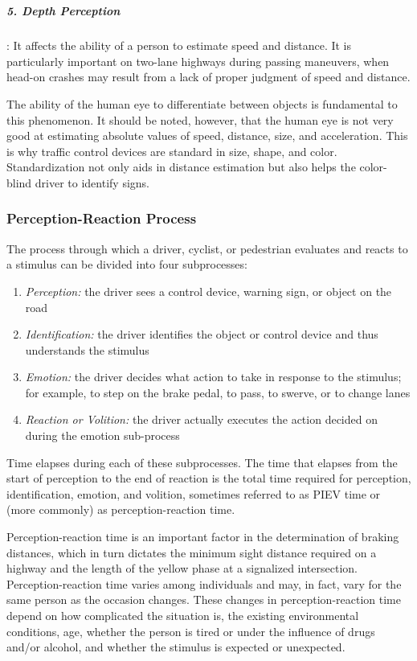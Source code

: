 \\
\subparagraph{5. Depth Perception}: It affects the ability of a person to estimate speed and distance. It is particularly important on two-lane highways during passing maneuvers, when head-on crashes may result from a lack of proper judgment of speed and distance.\par
The ability of the human eye to differentiate between objects is fundamental to this phenomenon. It should be noted, however, that the human eye is not very good at estimating absolute values of speed, distance, size, and acceleration. This is why traffic control devices are standard in size, shape, and color. Standardization not only aids in distance estimation but also helps the color-blind driver to identify signs.
\\
\subsubsection{Perception-Reaction Process}
The process through which a driver, cyclist, or pedestrian evaluates and reacts to a stimulus can be divided into four subprocesses:
\begin{enumerate}
	\item \emph{Perception:} the driver sees a control device, warning sign, or object on the road
	\item \emph{Identification:} the driver identifies the object or control device and thus understands the stimulus
	\item \emph{Emotion:} the driver decides what action to take in response to the stimulus; for example, to step on the brake pedal, to pass, to swerve, or to change lanes
	\item \emph{Reaction or Volition:} the driver actually executes the action decided on during the emotion sub-process
\end{enumerate}
\par
Time elapses during each of these subprocesses. The time that elapses from the start of perception to the end of reaction is the total time required for perception, identification, emotion, and volition, sometimes referred to as PIEV time or (more commonly) as perception-reaction time.\\
\par
Perception-reaction time is an important factor in the determination of braking distances, which in turn dictates the minimum sight distance required on a highway and the length of the yellow phase at a signalized intersection. Perception-reaction time varies among individuals and may, in fact, vary for the same person as the occasion changes. These changes in perception-reaction time depend on how complicated the situation is, the existing environmental conditions, age, whether the person is tired or under the influence of drugs and/or alcohol, and whether the stimulus is expected or unexpected.\\
